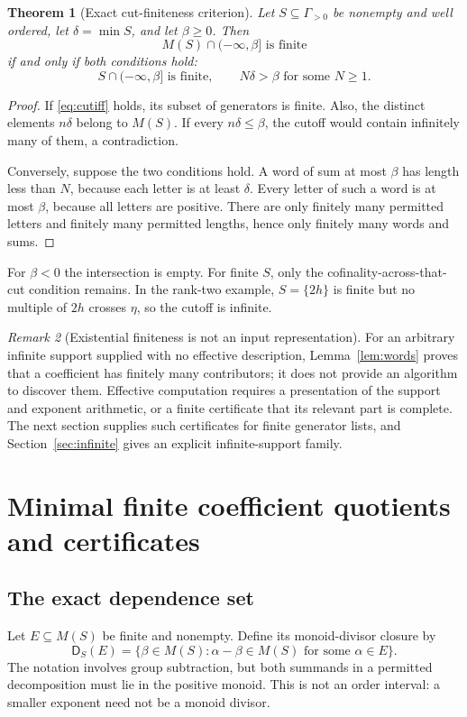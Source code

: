 \documentclass[11pt,a4paper]{article}
\newtheorem{theorem}{Theorem}[section]
\theoremstyle{definition}
\theoremstyle{remark}
\newtheorem{remark}[theorem]{Remark}
\newcommand{\Div}{\mathsf D}
\begin{document}
\begin{theorem}[Exact cut-finiteness criterion]\label{thm:cut}
Let $S\subseteq\Gamma_{>0}$ be nonempty and well ordered, let
$\delta=\min S$, and let $\beta\ge0$. Then
\begin{equation}\label{eq:cutiff}
 M(S)\cap(-\infty,\beta]\text{ is finite}
\end{equation}
if and only if both conditions hold:
\[
 S\cap(-\infty,\beta]\text{ is finite},
 \qquad N\delta>\beta\text{ for some }N\ge1.
\]
\end{theorem}
\begin{proof}
If \eqref{eq:cutiff} holds, its subset of generators is finite.
Also, the distinct elements $n\delta$ belong to $M(S)$. If every
$n\delta\le\beta$, the cutoff would contain infinitely many of them,
a contradiction.

Conversely, suppose the two conditions hold. A word of sum at most
$\beta$ has length less than $N$, because each letter is at least
$\delta$. Every letter of such a word is at most $\beta$, because all
letters are positive. There are only finitely many permitted letters and
finitely many permitted lengths, hence only finitely many words and sums.
\end{proof}

For $\beta<0$ the intersection is empty. For finite $S$, only the
cofinality-across-that-cut condition remains. In the rank-two example,
$S=\{2h\}$ is finite but no multiple of $2h$ crosses $\eta$, so the cutoff
is infinite.

\begin{remark}[Existential finiteness is not an input representation]
For an arbitrary infinite support supplied with no effective description,
Lemma~\ref{lem:words} proves that a coefficient has finitely many
contributors; it does not provide an algorithm to discover them. Effective
computation requires a presentation of the support and exponent arithmetic,
or a finite certificate that its relevant part is complete. The next
section supplies such certificates for finite generator lists, and
Section~\ref{sec:infinite} gives an explicit infinite-support family.
\end{remark}

\section{Minimal finite coefficient quotients and certificates}
\label{sec:certificates}

\subsection{The exact dependence set}
Let $E\subseteq M(S)$ be finite and nonempty. Define its monoid-divisor
closure by
\begin{equation}\label{eq:divisors}
 \Div_S(E)=\{\beta\in M(S):\alpha-\beta\in M(S)
                              \text{ for some }\alpha\in E\}.
\end{equation}
The notation involves group subtraction, but both summands in a permitted
decomposition must lie in the positive monoid. This is not an order
interval: a smaller exponent need not be a monoid divisor.
\end{document}
